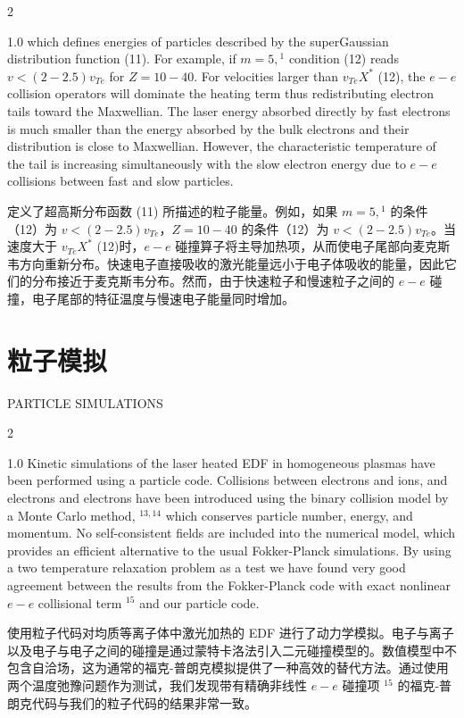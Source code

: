 \documentclass[oneside,onecolumn]{article}
\newcommand\enzhbox[2]{
  	\quad\par \begin{paracol}{2} \colseprulecolor{black} 
  			\begin{spacing}{1.0}
  				\footnotesize  #1
  			\end{spacing}
  		\switchcolumn[1] 
  		#2
  	\end{paracol} 
  }
\begin{document}
\begin{sloppypar}
 
\enzhbox{   which defines energies of particles described by the superGaussian distribution function (11). For example, if $m=5,{ }^{1}$ condition (12) reads $v<(2-2.5) v_{T e}$ for $Z=10-40$. For velocities larger than $v_{T e} X^{*}$ (12), the $e-e$ collision operators will dominate the heating term thus redistributing electron tails toward the Maxwellian. The laser energy absorbed directly by fast electrons is much smaller than the energy absorbed by the bulk electrons and their distribution is close to Maxwellian. However, the characteristic temperature of the tail is increasing simultaneously with the slow electron energy due to $e-e$ collisions between fast and slow particles.
}{
定义了超高斯分布函数 (11) 所描述的粒子能量。例如，如果 $m=5,{ }^{1}$ 的条件（12）为 $v<(2-2.5) v_{T e}$，$Z=10-40$ 的条件（12）为 $v<(2-2.5) v_{T e}$。当速度大于 $v_{T e} X^{*}$ (12)时，$e-e$ 碰撞算子将主导加热项，从而使电子尾部向麦克斯韦方向重新分布。快速电子直接吸收的激光能量远小于电子体吸收的能量，因此它们的分布接近于麦克斯韦分布。然而，由于快速粒子和慢速粒子之间的 $e-e$ 碰撞，电子尾部的特征温度与慢速电子能量同时增加。

}
  
  \section{粒子模拟}

 {  \small PARTICLE SIMULATIONS\par }
 
\enzhbox{   Kinetic simulations of the laser heated EDF in homogeneous plasmas have been performed using a particle code. Collisions between electrons and ions, and electrons and electrons have been introduced using the binary collision model by a Monte Carlo method, ${ }^{13,14}$ which conserves particle number, energy, and momentum. No self-consistent fields are included into the numerical model, which provides an efficient alternative to the usual Fokker-Planck simulations. By using a two temperature relaxation problem as a test we have found very good agreement between the results from the Fokker-Planck code with exact nonlinear $e-e$ collisional term ${ }^{15}$ and our particle code.
}{
使用粒子代码对均质等离子体中激光加热的 EDF 进行了动力学模拟。电子与离子以及电子与电子之间的碰撞是通过蒙特卡洛法引入二元碰撞模型的。数值模型中不包含自洽场，这为通常的福克-普朗克模拟提供了一种高效的替代方法。通过使用两个温度弛豫问题作为测试，我们发现带有精确非线性 $e-e$ 碰撞项 ${ }^{15}$ 的福克-普朗克代码与我们的粒子代码的结果非常一致。

}
\end{sloppypar}
\end{document}
